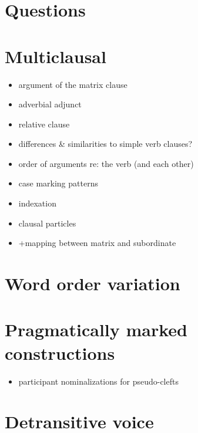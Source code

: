 \documentclass{memoir}
\begin{document}
\chapter{\texorpdfstring{Questions \label{questions}}{Questions }}

\chapter{\texorpdfstring{Multiclausal
\label{multiclausal}}{Multiclausal }}

\begin{itemize}
\item
  argument of the matrix clause
\item
  adverbial adjunct
\item
  relative clause
\item
  differences \& similarities to simple verb clauses?
\item
  order of arguments re: the verb (and each other)
\item
  case marking patterns
\item
  indexation
\item
  clausal particles
\item
  +mapping between matrix and subordinate
\end{itemize}

\chapter{\texorpdfstring{Word order variation
\label{wordorder}}{Word order variation }}

\chapter{\texorpdfstring{Pragmatically marked constructions
\label{pragmarked}}{Pragmatically marked constructions }}

\begin{itemize}
\tightlist
\item
  participant nominalizations for pseudo-clefts
\end{itemize}

\chapter{\texorpdfstring{Detransitive voice
\label{voice}}{Detransitive voice }}
\end{document}
